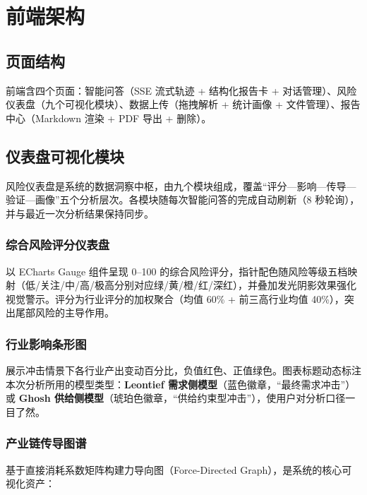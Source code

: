\documentclass[12pt, a4paper]{ctexart}
\begin{document}
\section{前端架构}

\subsection{页面结构}

前端含四个页面：智能问答（SSE 流式轨迹 + 结构化报告卡 + 对话管理）、风险仪表盘（九个可视化模块）、数据上传（拖拽解析 + 统计画像 + 文件管理）、报告中心（Markdown 渲染 + PDF 导出 + 删除）。

\subsection{仪表盘可视化模块}

风险仪表盘是系统的数据洞察中枢，由九个模块组成，覆盖``评分—影响—传导—验证—画像''五个分析层次。各模块随每次智能问答的完成自动刷新（8 秒轮询），并与最近一次分析结果保持同步。

\subsubsection{综合风险评分仪表盘}

以 ECharts Gauge 组件呈现 0--100 的综合风险评分，指针配色随风险等级五档映射（低/关注/中/高/极高分别对应绿/黄/橙/红/深红），并叠加发光阴影效果强化视觉警示。评分为行业评分的加权聚合（均值 60\% + 前三高行业均值 40\%），突出尾部风险的主导作用。

\subsubsection{行业影响条形图}

展示冲击情景下各行业产出变动百分比，负值红色、正值绿色。图表标题动态标注本次分析所用的模型类型：\textbf{Leontief 需求侧模型}（蓝色徽章，``最终需求冲击''）或 \textbf{Ghosh 供给侧模型}（琥珀色徽章，``供给约束型冲击''），使用户对分析口径一目了然。

\subsubsection{产业链传导图谱}

基于直接消耗系数矩阵构建力导向图（Force-Directed Graph），是系统的核心可视化资产：
\end{document}
